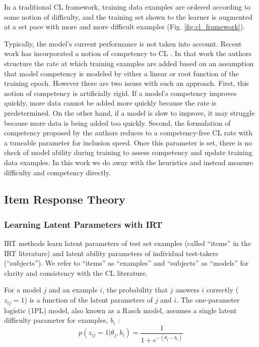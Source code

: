 \documentclass[letterpaper]{article} %
\begin{document}
In a traditional CL framework, training data examples are ordered according to some notion of difficulty, and the training set shown to the learner is augmented at a set pace with more and more difficult examples (Fig. \ref{fig:cl_framework}).

Typically, the model's current performance is not taken into account. 
Recent work has incorporated a notion of competency to CL \cite{platanios_competence-based_2019}.
In that work the authors structure the rate at which training examples are added based on an assumption that model competency is modeled by either a linear or root function of the training epoch.
However there are two issues with such an approach.
First, this notion of competency is artificially rigid.
If a model's competency improves quickly, more data cannot be added more quickly because the rate is predetermined.
On the other hand, if a model is slow to improve, it may struggle because more data is being added too quickly.
Second, the formulation of competency proposed by the authors reduces to a competency-free CL rate with a tuneable parameter for inclusion speed.
Once this parameter is set, there is no check of model ability during training to assess competency and update training data examples.
In this work we do away with the heuristics and instead measure difficulty and competency directly. 

\subsection{Item Response Theory}
\label{ssec:irt} 
\subsubsection{Learning Latent Parameters with IRT}
IRT methods learn latent parameters of test set examples (called ``items'' in the IRT literature) and latent ability parameters of individual test-takers (``subjects'').
We refer to ``items'' as ``examples'' and ``subjects'' as ``models'' for clarity and consistency with the CL literature.

For a model $j$ and an example $i$, the probability that $j$ answers $i$ correctly ($z_{ij}=1$) is a function of the latent parameters of $j$ and $i$.
The one-parameter logistic (1PL) model, also known as a Rasch model, assumes a single latent difficulty parameter for examples, $b_i$ \cite{rasch_studies_1960,baker_item_2004}:
\begin{equation} 
p(z_{ij} = 1 \vert \theta_j, b_i) = \frac{1}{1 + e^{-(\theta_j - b_i)}}
\label{eq:irt}
\end{equation}
\end{document}
